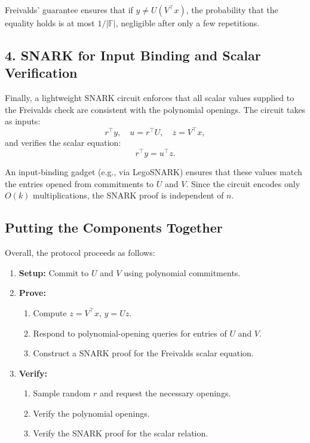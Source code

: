 \documentclass[11pt]{article}
\begin{document}
Freivalds' guarantee ensures that if $y \neq U(V^\top x)$, the probability
that the equality holds is at most $1/|\mathbb{F}|$, negligible after
only a few repetitions.

\subsection{4. SNARK for Input Binding and Scalar Verification}

Finally, a lightweight SNARK circuit enforces that all scalar values
supplied to the Freivalds check are consistent with the polynomial
openings.
The circuit takes as inputs:
\[
  r^\top y,\quad u = r^\top U,\quad z = V^\top x,
\]
and verifies the scalar equation:
\[
  r^\top y = u^\top z.
\]

An input-binding gadget (e.g., via LegoSNARK) ensures that these values
match the entries opened from commitments to $U$ and $V$.
Since the circuit encodes only $O(k)$ multiplications, the SNARK proof
is independent of $n$.

\subsection{Putting the Components Together}

Overall, the protocol proceeds as follows:
\begin{enumerate}
  \item \textbf{Setup:} Commit to $U$ and $V$ using polynomial commitments.
  \item \textbf{Prove:}  
    \begin{enumerate}
      \item Compute $z = V^\top x$, $y = U z$.
      \item Respond to polynomial-opening queries for entries of $U$ and $V$.
      \item Construct a SNARK proof for the Freivalds scalar equation.
    \end{enumerate}
  \item \textbf{Verify:}
    \begin{enumerate}
      \item Sample random $r$ and request the necessary openings.
      \item Verify the polynomial openings.
      \item Verify the SNARK proof for the scalar relation.
    \end{enumerate}
\end{enumerate}
\end{document}
